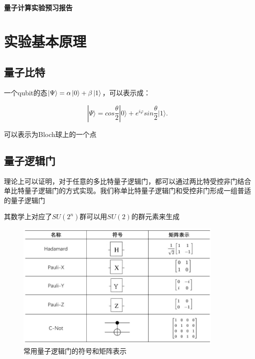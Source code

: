 \documentclass[a4paper,UTF8]{ctexart}
\begin{document}
\begin{center}
    \textbf{\Large 量子计算实验预习报告}
    \par {}
\end{center}

\section{实验基本原理}

\subsection{量子比特}

一个qubit的态$\ket{\Psi} = \alpha \ket{0} + \beta \ket{1}$，可以表示成：

\begin{equation}|\Psi\rangle=cos\frac\theta2|0\rangle+e^{i\varphi}sin\frac\theta2|1\rangle.\end{equation}

可以表示为Bloch球上的一个点

\subsection{量子逻辑门}

理论上可以证明，对于任意的多比特量子逻辑门，都可以通过两比特受控非门结合单比特量子逻辑门的方式实现。我们称单比特量子逻辑门和受控非门形成一组普适的量子逻辑门

其数学上对应了$SU(2^n)$群可以用$SU(2)$的群元素来生成

\begin{figure}[H]
    \centering
    \begin{minipage}[b]{0.9\textwidth}
        \centering
        \includegraphics[width=0.9\textwidth]{./fig1.jpg}
        \caption{常用量子逻辑门的符号和矩阵表示}
    \end{minipage}
\end{figure}
\end{document}
